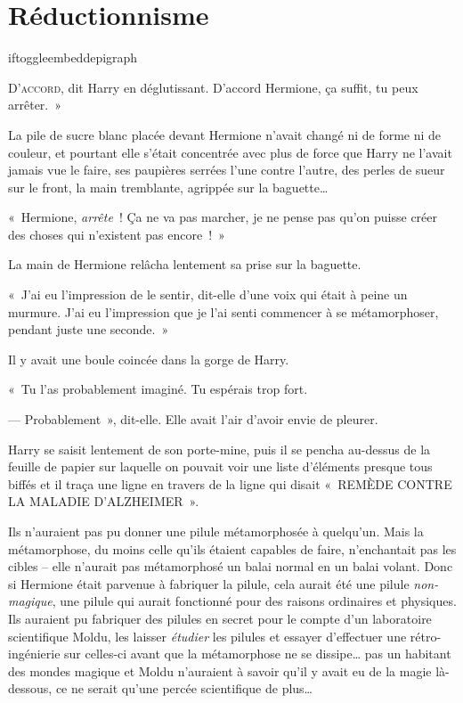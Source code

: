 \chapter{Réductionnisme}

iftoggle{embeddepigraph}{}{}

\lettrine[ante=«~]{D}{'accord}, dit Harry en déglutissant. D'accord Hermione, ça suffit, tu peux arrêter.~»

La pile de sucre blanc placée devant Hermione n'avait changé ni de forme ni de couleur, et pourtant elle s'était concentrée avec plus de force que Harry ne l'avait jamais vue le faire, ses paupières serrées l'une contre l'autre, des perles de sueur sur le front, la main tremblante, agrippée sur la baguette…

«~Hermione, \emph{arrête}~! Ça ne va pas marcher, je ne pense pas qu'on puisse créer des choses qui n'existent pas encore~!~»

La main de Hermione relâcha lentement sa prise sur la baguette.

«~J'ai eu l'impression de le sentir, dit-elle d'une voix qui était à peine un murmure. J'ai eu l'impression que je l'ai senti commencer à se métamorphoser, pendant juste une seconde.~»

Il y avait une boule coincée dans la gorge de Harry.

«~Tu l'as probablement imaginé. Tu espérais trop fort.

--- Probablement~», dit-elle. Elle avait l'air d'avoir envie de pleurer.

Harry se saisit lentement de son porte-mine, puis il se pencha au-dessus de la feuille de papier sur laquelle on pouvait voir une liste d'éléments presque tous biffés et il traça une ligne en travers de la ligne qui disait «~REMÈDE CONTRE LA MALADIE D'ALZHEIMER~».

Ils n'auraient pas pu donner une pilule métamorphosée à quelqu'un. Mais la métamorphose, du moins celle qu'ils étaient capables de faire, n'enchantait pas les cibles -- elle n'aurait pas métamorphosé un balai normal en un balai volant. Donc si Hermione était parvenue à fabriquer la pilule, cela aurait été une pilule \emph{non-magique}, une pilule qui aurait fonctionné pour des raisons ordinaires et physiques. Ils auraient pu fabriquer des pilules en secret pour le compte d'un laboratoire scientifique Moldu, les laisser \emph{étudier} les pilules et essayer d'effectuer une rétro-ingénierie sur celles-ci avant que la métamorphose ne se dissipe… pas un habitant des mondes magique et Moldu n'auraient à savoir qu'il y avait eu de la magie là-dessous, ce ne serait qu'une percée scientifique de plus…

